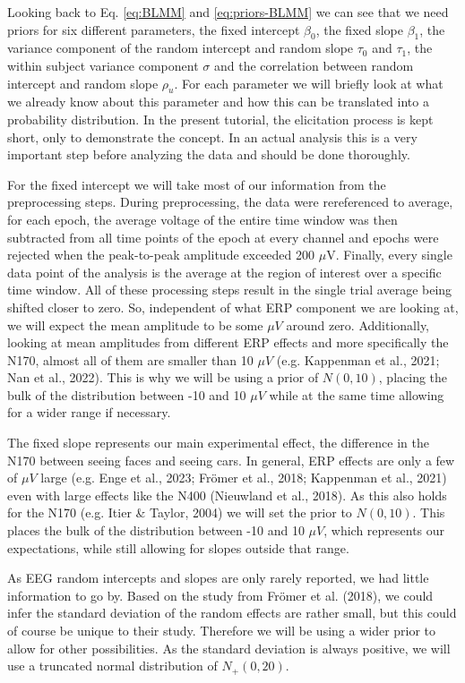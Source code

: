 \documentclass[
  doc,12pt,floatsintext]{apa7}
\begin{document}
Looking back to Eq. \eqref{eq:BLMM} and \eqref{eq:priors-BLMM} we can see that we need priors for six different parameters, the fixed intercept \(\beta_0\), the fixed slope \(\beta_1\), the variance component of the random intercept and random slope \(\tau_0\) and \(\tau_1\), the within subject variance component \(\sigma\) and the correlation between random intercept and random slope \(\rho_u\). For each parameter we will briefly look at what we already know about this parameter and how this can be translated into a probability distribution. In the present tutorial, the elicitation process is kept short, only to demonstrate the concept. In an actual analysis this is a very important step before analyzing the data and should be done thoroughly.

For the fixed intercept we will take most of our information from the preprocessing steps. During preprocessing, the data were rereferenced to average, for each epoch, the average voltage of the entire time window was then subtracted from all time points of the epoch at every channel and epochs were rejected when the peak-to-peak amplitude exceeded 200 \(\mu\)V. Finally, every single data point of the analysis is the average at the region of interest over a specific time window. All of these processing steps result in the single trial average being shifted closer to zero. So, independent of what ERP component we are looking at, we will expect the mean amplitude to be some \(\mu V\) around zero. Additionally, looking at mean amplitudes from different ERP effects and more specifically the N170, almost all of them are smaller than 10 \(\mu V\) (e.g. Kappenman et al., 2021; Nan et al., 2022). This is why we will be using a prior of \(N(0, 10)\), placing the bulk of the distribution between -10 and 10 \(\mu V\) while at the same time allowing for a wider range if necessary.

The fixed slope represents our main experimental effect, the difference in the N170 between seeing faces and seeing cars. In general, ERP effects are only a few of \(\mu V\) large (e.g. Enge et al., 2023; Frömer et al., 2018; Kappenman et al., 2021) even with large effects like the N400 (Nieuwland et al., 2018). As this also holds for the N170 (e.g. Itier \& Taylor, 2004) we will set the prior to \(N(0, 10)\). This places the bulk of the distribution between -10 and 10 \(\mu V\), which represents our expectations, while still allowing for slopes outside that range.

As EEG random intercepts and slopes are only rarely reported, we had little information to go by. Based on the study from Frömer et al. (2018), we could infer the standard deviation of the random effects are rather small, but this could of course be unique to their study. Therefore we will be using a wider prior to allow for other possibilities. As the standard deviation is always positive, we will use a truncated normal distribution of \(N_+(0, 20)\).
\end{document}
